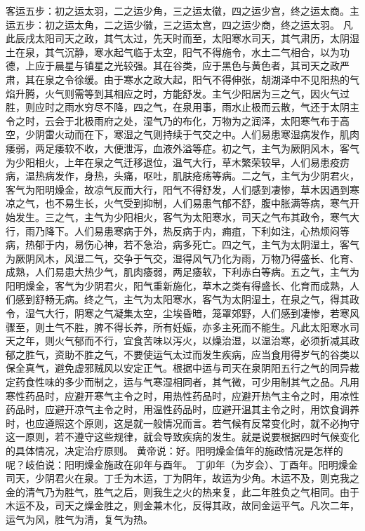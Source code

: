 \documentclass[12pt,UTF8]{ctexbook}
\begin{document}
客运五步：初之运太羽，二之运少角，三之运太徽，四之运少宫，终之运太商。主运五步：初之运太角，二之运少徽，三之运太宫，四之运少商，终之运太羽。
凡此辰戌太阳司天之政，其气太过，先天时而至，太阳寒水司天，其气肃历，太阴湿土在泉，其气沉静，寒水起气临于太空，阳气不得施令，水土二气相合，以为功德，上应于晨星与镇星之光较强。其在谷类，应于黑色与黄色者，其司天之政严肃，其在泉之令徐缓。由于寒水之政大起，阳气不得伸张，胡湖泽中不见阳热的气焰升腾，火气则需等到其相应之时，方能舒发。主气少阳居为三之气，因火气过胜，则应时之雨水穷尽不降，四之气，在泉用事，雨水止极而云散，气还于太阴主令之时，云会于北极雨府之处，湿气乃的布化，万物为之润泽，太阳寒气布于高空，少阴雷火动而在下，寒湿之气则持续于气交之中。人们易患寒湿病发作，肌肉痿弱，两足痿软不收，大便泄泻，血液外溢等症。初之气，主气为厥阴风木，客气为少阳相火，上年在泉之气迁移退位，温气大行，草木繁荣较早，人们易患疫疠病，温热病发作，身热，头痛，呕吐，肌肤疮疡等病。二之气，主气为少阴君火，客气为阳明燥金，故凉气反而大行，阳气不得舒发，人们感到凄惨，草木因遇到寒凉之气，也不易生长，火气受到抑制，人们易患气郁不舒，腹中胀满等病，寒气开始发生。三之气，主气为少阳相火，客气为太阳寒水，司天之气布其政令，寒气大行，雨乃降下。人们易患寒病于外，热反病于内，痈疽，下利如注，心热烦闷等病，热郁于内，易伤心神，若不急治，病多死亡。四之气，主气为太阴湿土，客气为厥阴风木，风湿二气，交争于气交，湿得风气乃化为雨，万物乃得盛长、化育、成熟，人们易患大热少气，肌肉痿弱，两足痿软，下利赤白等病。五之气，主气为阳明燥金，客气为少阴君火，阳气重新施化，草木之类有得盛长、化育而成熟，人们感到舒畅无病。终之气，主气为太阳寒水，客气为太阴湿土，在泉之气，得其政令，湿气大行，阴寒之气凝集太空，尘埃昏暗，笼罩郊野，人们感到凄惨，若寒风骤至，则土气不胜，脾不得长养，所有妊娠，亦多主死而不能生。凡此太阳寒水司天之年，则火气郁而不行，宜食苦味以泻火，以燥治湿，以温治寒，必须折减其政郁之胜气，资助不胜之气，不要使运气太过而发生疾病，应当食用得岁气的谷类以保全真气，避免虚邪贼风以安定正气。根据中运与司天在泉阴阳五行之气的同异裁定药食性味的多少而制之，运与气寒湿相同者，其气微，可少用制其气之品。凡用寒性药品时，应避开寒气主令之时，用热性药品时，应避开热气主令之时，用凉性药品时，应避开凉气主令之时，用温性药品时，应避开温其主令之时，用饮食调养时，也应遵照这个原则，这是就一般情况而言。若气候有反常变化时，就不必拘守这一原则，若不遵守这些规律，就会导致疾病的发生。就是说要根据四时气候变化的具体情况，决定治疗原则。
黄帝说：好。阳明燥金值年的施政情况是怎样的呢？岐伯说：阳明燥金施政在卯年与酉年。
丁卯年（为岁会）、丁酉年。阳明燥金司天，少阴君火在泉。丁壬为木运，丁为阴年，故运为少角。木运不及，则克我之金的清气乃为胜气，胜气之后，则我生之火的热来复，此二年胜负之气相同。由于木运不及，司天之燥金胜之，则金兼木化，反得其政，故同金运平气。凡次二年，运气为风，胜气为清，复气为热。
\end{document}

